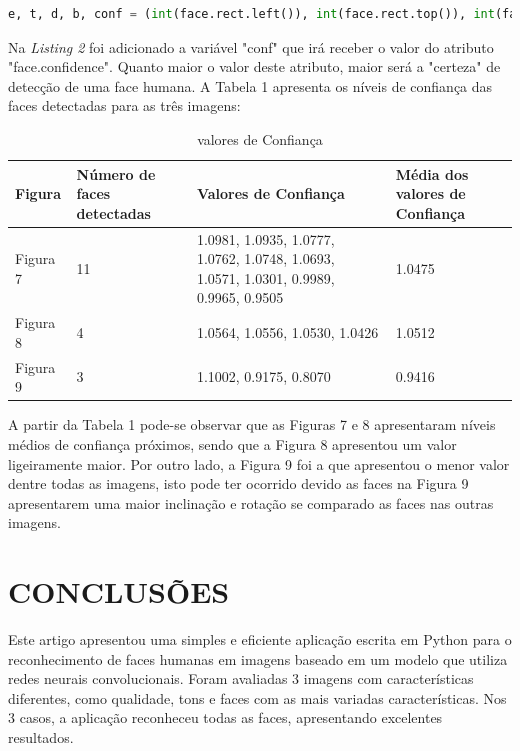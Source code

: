 \documentclass[conference]{IEEEtran}
\begin{document}
		\begin{lstlisting}[breaklines=true, language=Python, caption=Código para descobrir a confiança no DLIB]
    e, t, d, b, conf = (int(face.rect.left()), int(face.rect.top()), int(face.rect.right()), int(face.rect.bottom()), face.confidence)\end{lstlisting}

        Na \textit{Listing 2} foi adicionado a variável "conf" que irá receber o valor do atributo "face.confidence". Quanto maior o valor deste atributo, maior será a "certeza" de detecção de uma face humana. A Tabela 1 apresenta os níveis de confiança das faces detectadas para as três imagens:
        
		\begin{table}[h!b]
		\caption{valores de Confiança}
		\label{table}
		\setlength{\tabcolsep}{4pt}
		\begin{tabular}{|p{30pt}|p{50pt}|p{90pt}|p{50pt}|}
			\hline
				Figura & Número de faces detectadas & Valores de Confiança & Média dos valores de Confiança\\
			\hline
				Figura 7 & 11 & 1.0981, 1.0935, 1.0777, 1.0762, 1.0748, 1.0693, 1.0571, 1.0301, 0.9989, 0.9965, 0.9505 				& 1.0475 \\
			\hline
				Figura 8 & 4 & 1.0564, 1.0556, 1.0530, 1.0426 & 1.0512\\ 
			\hline
				Figura 9 & 3 & 1.1002, 0.9175, 0.8070 & 0.9416\\ 
			\hline
		\end{tabular}
		\label{tab1}
		\end{table}        
          
          A partir da Tabela 1 pode-se observar que as Figuras 7 e 8 apresentaram níveis médios de confiança próximos, sendo que a Figura 8 apresentou um valor ligeiramente maior. Por outro lado, a Figura 9 foi a que apresentou o menor valor dentre todas as imagens, isto pode ter ocorrido devido as faces na Figura 9 apresentarem uma maior inclinação e rotação se comparado as faces nas outras imagens.
	
	\section{CONCLUSÕES}
         Este artigo apresentou uma simples e eficiente aplicação escrita em Python para o reconhecimento de faces humanas em imagens baseado em um modelo que utiliza redes neurais convolucionais. Foram avaliadas 3 imagens com características diferentes, como qualidade, tons e faces com as mais variadas características. Nos 3 casos, a aplicação reconheceu todas as faces, apresentando excelentes resultados. 
        
\end{document}

